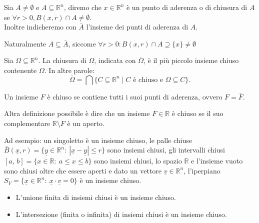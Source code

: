 %
\vspace{0.5cm}
\begin{definition}[\textcolor{blue}{punti di aderenza}]
	Sia $A \neq \emptyset$ e $A \subseteq \mathbb{R}^n$, diremo che $x \in \mathbb{R}^n$ è un punto di aderenza o di chiusura di $A$ se $\forall r > 0, B(x, r) \cap A \neq \emptyset$. \\
	Inoltre indicheremo con $\bar{A}$ l'insieme dei punti di aderenza di $A$.
\end{definition}
%
\begin{remark}
	Naturalmente $A \subseteq \bar{A}$, siccome $\forall r > 0: B(x, r) \cap A \supseteq \{ x \} \neq \emptyset$
\end{remark}
%
\begin{definition}[\textcolor{blue}{Chiusura}]
	Sia $\Omega \subseteq \mathbb{R}^n$. La chiusura di $\Omega$, indicata con $\overline{\Omega}$, è il più piccolo insieme chiuso contenente $\Omega$. In altre parole:
	\[
	\overline{\Omega} = \bigcap \{ C \subseteq \mathbb{R}^n \mid C \text{ è chiuso e } \Omega \subseteq C \}.
	\]
\end{definition}
%
\vspace{0.5cm}
\begin{definition}[\textcolor{blue}{Insieme chiuso}]
	Un insieme $F$ è chiuso se contiene tutti i suoi punti di aderenza, ovvero $F = \bar{F}$.
	
	Altra definizione possibile è dire che un insieme $F\in\mathbb{R}$ è chiuso se il suo complementare $\mathbb{R}\setminus F$ è un aperto. 
\end{definition}
%
Ad esempio: un singoletto è un insieme chiuso, le palle chiuse $\bar B(\underline x,r)=\{\underline y\in\mathbb{R}^n:\ |\underline x-\underline y|\leq r\}$ sono insiemi chiusi, gli intervalli chiusi $[a,\, b]=\{x\in \mathbb{R}:\ a\leq x\leq b\}$ sono insiemi chiusi, lo spazio $\mathbb{R}$ e l'insieme vuoto sono chiusi oltre che essere aperti e dato un vettore $\underline v\in \mathbb{R}^n$, l'iperpiano $S_V=\{\underline x\in \mathbb{R}^n:\ \underline x\cdot \underline v = 0\}$ è un insieme chiuso.
%
\vspace{0.5cm}
\begin{prop}
	\begin{itemize}
		\item L’unione finita di insiemi chiusi è un insieme chiuso.
		\item L’intersezione (finita o infinita) di insiemi chiusi è un insieme chiuso.
	\end{itemize}
\end{prop}
